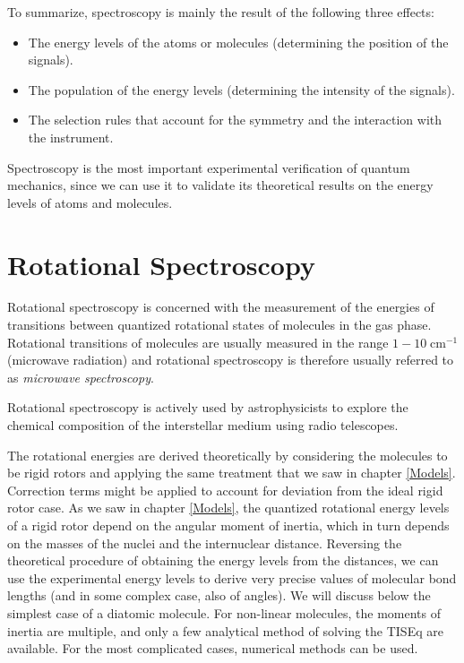 \documentclass[
  9pt,
]{extbook}
\providecommand{\tightlist}{%
  \setlength{\itemsep}{0pt}\setlength{\parskip}{0pt}}
\theoremstyle{definition}
\theoremstyle{definition}
\theoremstyle{definition}
\theoremstyle{remark}
\begin{document}
To summarize, spectroscopy is mainly the result of the following three effects:

\begin{itemize}
\tightlist
\item
  The energy levels of the atoms or molecules (determining the position of the signals).
\item
  The population of the energy levels (determining the intensity of the signals).
\item
  The selection rules that account for the symmetry and the interaction with the instrument.
\end{itemize}

Spectroscopy is the most important experimental verification of quantum mechanics, since we can use it to validate its theoretical results on the energy levels of atoms and molecules.

\hypertarget{rotational-spectroscopy}{%
\section{Rotational Spectroscopy}\label{rotational-spectroscopy}}

Rotational spectroscopy is concerned with the measurement of the energies of transitions between quantized rotational states of molecules in the gas phase. Rotational transitions of molecules are usually measured in the range \(1-10\; \text{cm}^{-1}\) (microwave radiation) and rotational spectroscopy is therefore usually referred to as \emph{microwave spectroscopy}.

Rotational spectroscopy is actively used by astrophysicists to explore the chemical composition of the interstellar medium using radio telescopes.

The rotational energies are derived theoretically by considering the molecules to be rigid rotors and applying the same treatment that we saw in chapter \ref{Models}. Correction terms might be applied to account for deviation from the ideal rigid rotor case. As we saw in chapter \ref{Models}, the quantized rotational energy levels of a rigid rotor depend on the angular moment of inertia, which in turn depends on the masses of the nuclei and the internuclear distance. Reversing the theoretical procedure of obtaining the energy levels from the distances, we can use the experimental energy levels to derive very precise values of molecular bond lengths (and in some complex case, also of angles). We will discuss below the simplest case of a diatomic molecule. For non-linear molecules, the moments of inertia are multiple, and only a few analytical method of solving the TISEq are available. For the most complicated cases, numerical methods can be used.
\end{document}
